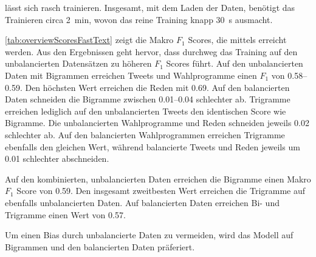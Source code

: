 \ft lässt sich rasch trainieren. Insgesamt, mit dem Laden der Daten, benötigt das Trainieren circa \SI{2}{\minute}, wovon das reine Training knapp \SI{30}{\second} ausmacht.

\autoref{tab:overviewScoresFastText} zeigt die Makro \(F_1\) Scores, die mittels \ft erreicht werden. Aus den Ergebnissen geht hervor, dass durchweg das Training auf den unbalancierten Datensätzen zu höheren \(F_{1}\) Scores führt. Auf den unbalancierten Daten mit Bigrammen erreichen Tweets und Wahlprogramme einen \(F_{1}\) von \numrange{0.58}{0.59}. Den höchsten Wert erreichen die Reden mit \num{0.69}. Auf den balancierten Daten schneiden die Bigramme zwischen \numrange{0.01}{0.04} schlechter ab. Trigramme erreichen lediglich auf den unbalancierten Tweets den identischen Score wie Bigramme. Die unbalancierten Wahlprogramme und Reden schneiden jeweils \num{0.02} schlechter ab. Auf den balancierten Wahlprogrammen erreichen Trigramme ebenfalls den gleichen Wert, während balancierte Tweets und Reden jeweils um \num{0.01} schlechter abschneiden.

Auf den kombinierten, unbalancierten Daten erreichen die Bigramme einen Makro \(F_1\) Score von \num{0.59}. Den insgesamt zweitbesten Wert erreichen die Trigramme auf ebenfalls unbalancierten Daten. Auf balancierten Daten erreichen Bi- und Trigramme einen Wert von \num{0.57}.

Um einen Bias durch unbalancierte Daten zu vermeiden, wird das \ft Modell auf Bigrammen und den balancierten Daten präferiert.

